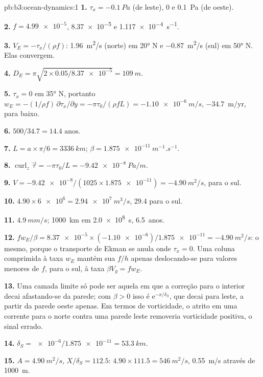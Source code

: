 \begin{solution}{pb:b3:ocean-dynamics:1}
\textbf{1.} $\tau_x = \qty{-0.1}{Pa}$ (de leste), 0 e \qty{+0.1}{Pa}
(de oeste).

\textbf{2.} $f = \num{4.99e-5}$, \num{8.37e-5} e
\qty{1.117e-4}{s^{-1}}.

\textbf{3.} $V_E = -\tau_x/(\rho f)$: \qty{+1.96}{m^2/s} (norte) em
\ang{20} N e \qty{-0.87}{m^2/s} (sul) em \ang{50} N. Elas convergem.

\textbf{4.} $D_E = \pi\sqrt{2\times0.05/\num{8.37e-5}} = \qty{109}{m}$.

\textbf{5.} $\tau_x = 0$ em \ang{35} N, portanto $w_E = -(1/\rho f)\,
\partial\tau_x/\partial y = -\pi\tau_0/(\rho fL) = \qty{-1.10e-6}{m/s}$,
\qty{-34.7}{m/yr}, para baixo.

\textbf{6.} $500/34.7 = \num{14.4}\text{ anos}$.

\textbf{7.} $L = a\times\pi/6 = \qty{3336}{km}$; $\beta =
\qty{1.875e-11}{m^{-1}.s^{-1}}$.

\textbf{8.} $\operatorname{curl}_z\vec\tau = -\pi\tau_0/L =
\qty{-9.42e-8}{Pa/m}$.

\textbf{9.} $V = \num{-9.42e-8}/(1025\times\num{1.875e-11}) =
\qty{-4.90}{m^2/s}$, para o sul.

\textbf{10.} $4.90\times\num{6e6} = \qty{2.94e7}{m^3/s}$,
\qty{29.4}{\sverdrup} para o sul.

\textbf{11.} $\qty{4.9}{mm/s}$; \qty{1000}{km} em \qty{2.0e8}{s},
\num{6.5}~anos.

\textbf{12.} $fw_E/\beta = \num{8.37e-5}\times(\num{-1.10e-6})/
\num{1.875e-11} = \qty{-4.90}{m^2/s}$: o mesmo, porque o
transporte de Ekman se anula onde $\tau_x = 0$. Uma coluna comprimida à taxa $w_E$
mantém sua  $f/h$ apenas deslocando-se para valores menores de $f$, para o sul,
à taxa $\beta V_g = fw_E$.

\textbf{13.} Uma camada limite só pode ser aquela em que a correção para
o interior decai afastando-se da parede; com $\beta > 0$ isso é
$\mathrm e^{-x/\delta_S}$, que decai para leste, a partir da parede oeste
apenas. Em termos de vorticidade, o atrito em uma corrente para o norte contra uma
parede leste removeria vorticidade positiva, o sinal errado.

\textbf{14.} $\delta_S = \num{e-6}/\num{1.875e-11} = \qty{53.3}{km}$.

\textbf{15.} $A = \qty{4.90}{m^2/s}$, $X/\delta_S = 112.5$:
$4.90\times111.5 = \qty{546}{m^2/s}$, \qty{0.55}{m/s} através de
\qty{1000}{m}.


\end{solution}
